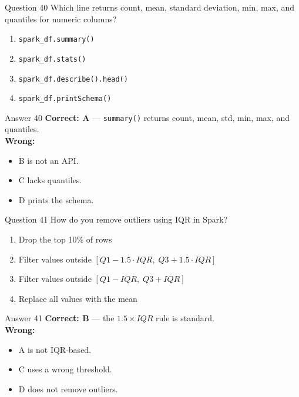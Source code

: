 \documentclass[aspectratio=169,11pt]{beamer}
\begin{document}
	\begin{frame}{Question 40}
		Which line returns count, mean, standard deviation, min, max, and quantiles for numeric columns?
		\begin{enumerate}[label=\Alph*.]
			\item \texttt{spark\_df.summary()}
			\item \texttt{spark\_df.stats()}
			\item \texttt{spark\_df.describe().head()}
			\item \texttt{spark\_df.printSchema()}
		\end{enumerate}
	\end{frame}
	\begin{frame}{Answer 40}
		\textbf{Correct: A} --- \texttt{summary()} returns count, mean, std, min, max, and quantiles.\\
		\vspace{0.5em}
		\textbf{Wrong:}
		\begin{itemize}
			\item B is not an API.
			\item C lacks quantiles.
			\item D prints the schema.
		\end{itemize}
	\end{frame}
	
	\begin{frame}{Question 41}
		How do you remove outliers using IQR in Spark?
		\begin{enumerate}[label=\Alph*.]
			\item Drop the top 10\% of rows
			\item Filter values outside $[Q1 - 1.5 \cdot IQR,\; Q3 + 1.5 \cdot IQR]$
			\item Filter values outside $[Q1 - IQR,\; Q3 + IQR]$
			\item Replace all values with the mean
		\end{enumerate}
	\end{frame}
	\begin{frame}{Answer 41}
		\textbf{Correct: B} --- the $1.5 \times IQR$ rule is standard.\\
		\vspace{0.5em}
		\textbf{Wrong:}
		\begin{itemize}
			\item A is not IQR-based.
			\item C uses a wrong threshold.
			\item D does not remove outliers.
		\end{itemize}
	\end{frame}
	
\end{document}
